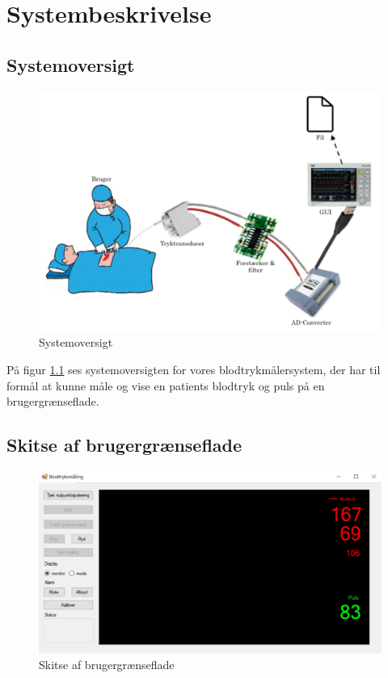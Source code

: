 \chapter{Systembeskrivelse}


\clearpage
\section{Systemoversigt}

	\begin{figure}[h!]
	\centering
	\includegraphics[width=0.55\linewidth]{Systembeskrivelse/Systemoversigt}
	\caption{Systemoversigt}
	\label{fig:Systemoversigt}
\end{figure}
\vspace{1 cm}

På figur \ref{fig:Systemoversigt} ses systemoversigten for vores blodtrykmålersystem, der har til formål at kunne måle og vise en patients blodtryk og puls på en brugergrænseflade. 

\vspace{1.5 cm}
\section{Skitse af brugergrænseflade}
\vspace{0.7 cm}
\begin{figure}[h!]
	\centering
	\includegraphics[width=0.7\linewidth]{Systembeskrivelse/Brugergraenseflade}
	\caption{Skitse af brugergrænseflade}
	\label{fig:Brugergraenseflade}
\end{figure}

\clearpage